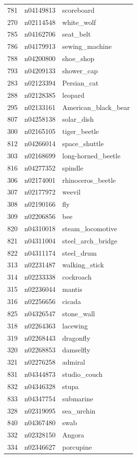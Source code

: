 \begin{table}
\begin{tabular}{cll}
781 & n04149813 & scoreboard \\
270 & n02114548 & white_wolf \\
785 & n04162706 & seat_belt \\
786 & n04179913 & sewing_machine \\
788 & n04200800 & shoe_shop \\
793 & n04209133 & shower_cap \\
283 & n02123394 & Persian_cat \\
288 & n02128385 & leopard \\
295 & n02133161 & American_black_bear \\
807 & n04258138 & solar_dish \\
300 & n02165105 & tiger_beetle \\
812 & n04266014 & space_shuttle \\
303 & n02168699 & long-horned_beetle \\
816 & n04277352 & spindle \\
306 & n02174001 & rhinoceros_beetle \\
307 & n02177972 & weevil \\
308 & n02190166 & fly \\
309 & n02206856 & bee \\
820 & n04310018 & steam_locomotive \\
821 & n04311004 & steel_arch_bridge \\
822 & n04311174 & steel_drum \\
313 & n02231487 & walking_stick \\
314 & n02233338 & cockroach \\
315 & n02236044 & mantis \\
316 & n02256656 & cicada \\
825 & n04326547 & stone_wall \\
318 & n02264363 & lacewing \\
319 & n02268443 & dragonfly \\
320 & n02268853 & damselfly \\
321 & n02276258 & admiral \\
831 & n04344873 & studio_couch \\
832 & n04346328 & stupa \\
833 & n04347754 & submarine \\
328 & n02319095 & sea_urchin \\
840 & n04367480 & swab \\
332 & n02328150 & Angora \\
334 & n02346627 & porcupine \\

\end{tabular}
\end{table}
